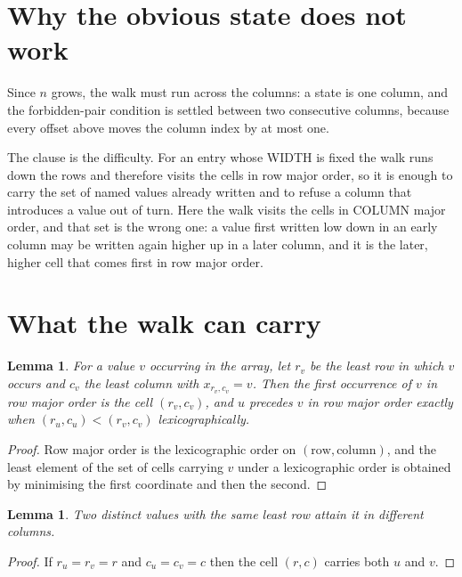 \documentclass[11pt,a4paper]{article}
\theoremstyle{plain}
\newtheorem{lemma}[theorem]{Lemma}
\theoremstyle{definition}
\begin{document}
\section{Why the obvious state does not work}

Since $n$ grows, the walk must run across the columns: a state is one column, and the
forbidden-pair condition is settled between two consecutive columns, because every offset above
moves the column index by at most one.

The clause is the difficulty. For an entry whose WIDTH is fixed the walk runs down the rows and
therefore visits the cells in row major order, so it is enough to carry the set of named values
already written and to refuse a column that introduces a value out of turn. Here the walk
visits the cells in COLUMN major order, and that set is the wrong one: a value first written
low down in an early column may be written again higher up in a later column, and it is the
later, higher cell that comes first in row major order.

\section{What the walk can carry}

\begin{lemma}\label{lem:key}
For a value $v$ occurring in the array, let $r_v$ be the least row in which $v$ occurs and
$c_v$ the least column with $x_{r_v,c_v}=v$. Then the first occurrence of $v$ in row major
order is the cell $(r_v,c_v)$, and $u$ precedes $v$ in row major order exactly when
$(r_u,c_u)<(r_v,c_v)$ lexicographically.
\end{lemma}

\begin{proof}
Row major order is the lexicographic order on $(\text{row},\text{column})$, and the least
element of the set of cells carrying $v$ under a lexicographic order is obtained by minimising
the first coordinate and then the second.
\end{proof}

\begin{lemma}\label{lem:tie}
Two distinct values with the same least row attain it in different columns.
\end{lemma}

\begin{proof}
If $r_u=r_v=r$ and $c_u=c_v=c$ then the cell $(r,c)$ carries both $u$ and $v$.
\end{proof}
\end{document}
